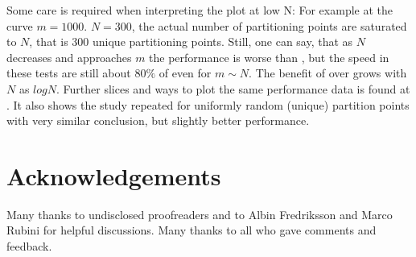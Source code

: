 Some care is required when interpreting the plot at low N: For example at the curve $m=1000$. $N=300$, the actual number of partitioning points are saturated to $N$, that is $300$ unique partitioning points. Still, one can say, that as $N$ decreases and approaches $m$ the performance is worse than , but the speed in these tests are still about $80\%$ of  even for $m \sim N$. The benefit of  over  grows with $N$ as $log N$. Further slices and ways to plot the same performance data is found at \cite{p2375RefImpl}. It also shows the study repeated for uniformly random (unique) partition points with very similar conclusion, but slightly better performance.


\section*{Acknowledgements}

Many thanks to undisclosed proofreaders and to 
Albin Fredriksson and Marco Rubini for helpful discussions. Many thanks to all who gave comments and feedback.


\renewcommand{\bibname}{References}



